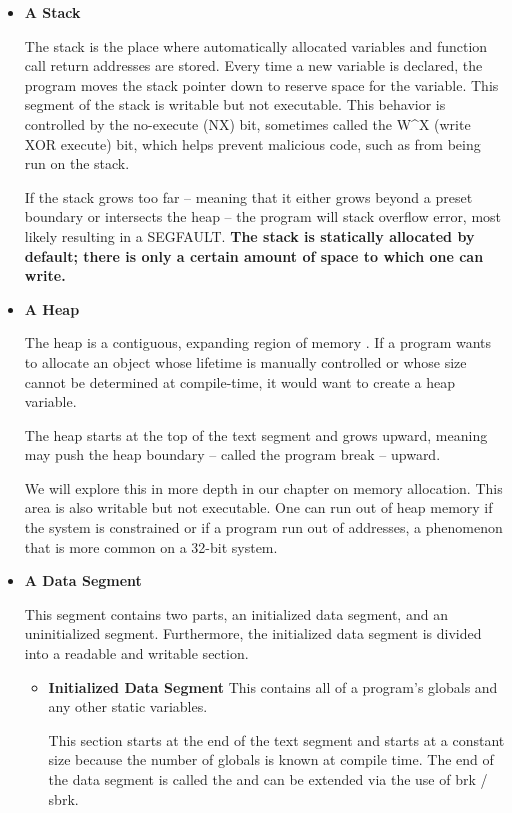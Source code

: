 \begin{itemize}
\item \textbf{A Stack}

The stack is the place where automatically allocated variables and function call return addresses are stored.
Every time a new variable is declared, the program moves the stack pointer down to reserve space for the variable.
This segment of the stack is writable but not executable.
		This behavior is controlled by the no-execute (NX) bit, sometimes called the W\^{}X (write XOR execute) bit, which helps prevent malicious code, such as  from being run on the stack.

If the stack grows too far -- meaning that it either grows beyond a preset boundary or intersects the heap -- the program will stack overflow error, most likely resulting in a SEGFAULT.
\textbf{The stack is statically allocated by default; there is only a certain amount of space to which one can write.}

\item \textbf{A Heap}

The heap is a contiguous, expanding region of memory \cite{mallocinternals}.
If a program wants to allocate an object whose lifetime is manually controlled or whose size cannot be determined at compile-time, it would want to create a heap variable.

The heap starts at the top of the text segment and grows upward, meaning  may push the heap boundary -- called the program break -- upward.

We will explore this in more depth in our chapter on memory allocation.
This area is also writable but not executable.
One can run out of heap memory if the system is constrained or if a program run out of addresses, a phenomenon that is more common on a 32-bit system.

\item \textbf{A Data Segment}

This segment contains two parts, an initialized data segment, and an uninitialized segment.
Furthermore, the initialized data segment is divided into a readable and writable section.

\begin{itemize}
    \item \textbf{Initialized Data Segment}
          This contains all of a program's globals and any other static variables.

          This section starts at the end of the text segment and starts at a constant size because the number of globals is known at compile time. The end of the data segment is called the  and can be extended via the use of brk / sbrk.


\end{itemize}
\end{itemize}
